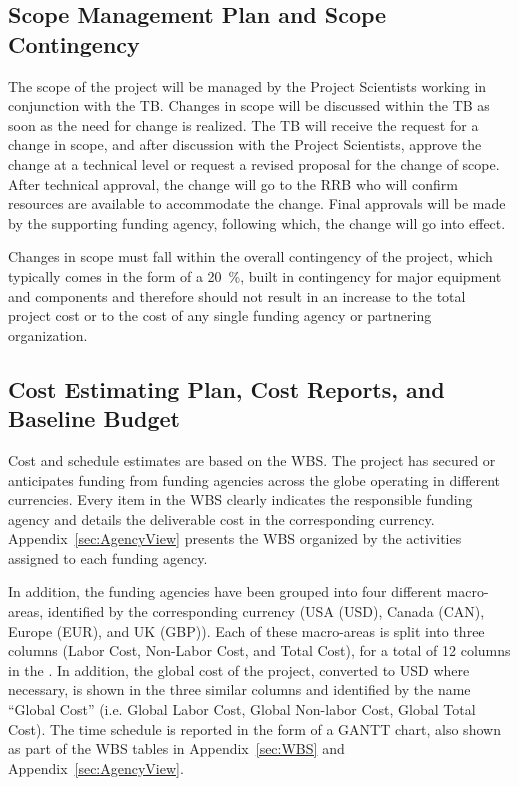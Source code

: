 \subsection{Scope Management Plan and Scope Contingency}
The scope of the project will be managed by the Project Scientists working in conjunction with the TB.  Changes in scope will be discussed within the TB as soon as the need for change is realized. The TB will receive the request for a change in scope, and after discussion with the Project Scientists, approve the change at a technical level or request a revised proposal for the change of scope. After technical approval, the change will go to the RRB who will confirm resources are available to accommodate the change.  Final approvals will be made by the supporting funding agency, following which, the change will go into effect.

Changes in scope must fall within the overall contingency of the project, which typically comes in the form of a \SI{20}{\percent}, built in contingency for major equipment and components and therefore should not result in an increase to the total project cost or to the cost of any single funding agency or partnering organization.  


\subsection{Cost Estimating Plan, Cost Reports, and Baseline Budget}
Cost and schedule estimates are based on the WBS. The project has secured or anticipates funding from funding agencies across the globe operating in different currencies. Every item in the WBS clearly indicates the responsible funding agency and details the deliverable cost in the corresponding currency. Appendix~\ref{sec:AgencyView} presents the WBS organized by the activities assigned to each funding agency.

In addition, the funding agencies have been grouped into four different macro-areas, identified by the corresponding currency (USA (USD), Canada (CAN), Europe (EUR), and UK (GBP)). Each of these macro-areas is split into three columns (Labor Cost, Non-Labor Cost, and Total Cost), for a total of \num{12} columns in the \WBS. In addition, the global cost of the project, converted to USD where necessary, is shown in the three similar columns and identified by the name ``Global Cost'' (i.e. Global Labor Cost, Global Non-labor Cost, Global Total Cost).  The time schedule is reported in the form of a GANTT chart, also shown as part of the WBS tables in Appendix~\ref{sec:WBS} and Appendix~\ref{sec:AgencyView}.  


